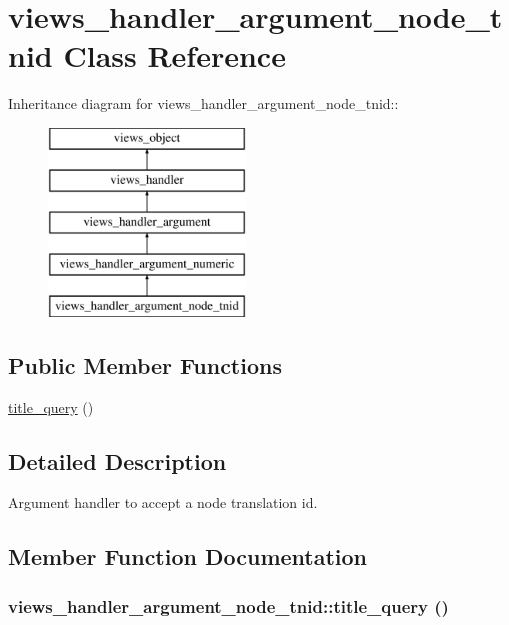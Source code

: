 \hypertarget{classviews__handler__argument__node__tnid}{
\section{views\_\-handler\_\-argument\_\-node\_\-tnid Class Reference}
\label{classviews__handler__argument__node__tnid}
}
Inheritance diagram for views\_\-handler\_\-argument\_\-node\_\-tnid::\begin{figure}[H]
\begin{center}
\leavevmode
\includegraphics[height=5cm]{classviews__handler__argument__node__tnid}
\end{center}
\end{figure}
\subsection*{Public Member Functions}
\begin{CompactItemize}
\item 
\hyperlink{classviews__handler__argument__node__tnid_4b22c61185c2c55b8fbfe40b4e131d69}{title\_\-query} ()
\end{CompactItemize}


\subsection{Detailed Description}
Argument handler to accept a node translation id. 

\subsection{Member Function Documentation}
\hypertarget{classviews__handler__argument__node__tnid_4b22c61185c2c55b8fbfe40b4e131d69}{
\subsubsection[{title\_\-query}]{\setlength{\rightskip}{0pt plus 5cm}views\_\-handler\_\-argument\_\-node\_\-tnid::title\_\-query ()}}
\label{classviews__handler__argument__node__tnid_4b22c61185c2c55b8fbfe40b4e131d69}


